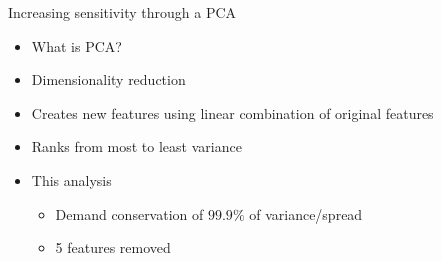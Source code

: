 \documentclass[UKenglish]{beamer}
\begin{document}
\begin{frame}{Increasing sensitivity through a PCA}
        \begin{itemize}
            \item What is PCA?
            \item Dimensionality reduction
            \item Creates new features using linear combination of original features
            \item Ranks from most to least variance
            \item This analysis
            \begin{itemize}
                \item Demand conservation of $99.9\%$ of variance/spread
                \item 5 features removed
            \end{itemize}
        \end{itemize}
\end{frame}
\end{document}
